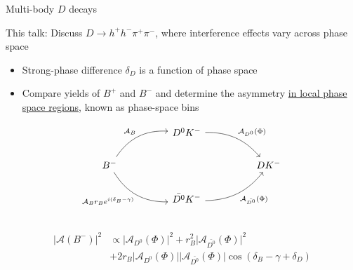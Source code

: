 \documentclass[xcolor={dvipsnames}]{beamer}
\begin{document}
\begin{frame}[fragile]{Multi-body $D$ decays}
  \begin{center}
    This talk: Discuss $D\to h^+h^-\pi^+\pi^-$, where interference effects vary across phase space
  \end{center}
  \vspace{-0.3cm}
  \begin{itemize}
    \setlength\itemsep{0.5em}
    \item{Strong-phase difference $\delta_D$ is a function of phase space}
    \item{Compare yields of $B^+$ and $B^-$ and determine the asymmetry \underline{in local phase space regions}, known as phase-space bins}
  \end{itemize}
  \begin{equation*}
    \begin{tikzcd}[column sep=huge]
      & D^0K^- \arrow[dr, bend left = 25, "\mathcal{A}_{D^0}(\Phi)"] & \\
      B^- \arrow[ur, bend left, "\mathcal{A}_B"] \arrow[dr, bend right, "\mathcal{A}_B r_B e^{i(\delta_B - \gamma)}"'] & [5cm] & DK^- \\
      & \bar{D^0}K^- \arrow[ur, bend right = 25, "\mathcal{A}_{\bar{D^0}}(\Phi)"'] & \\
    \end{tikzcd}
  \end{equation*}
  \vspace{-0.9cm}
  \begin{align*}
    \lvert\mathcal{A}(B^-)\lvert^2&\propto\lvert\mathcal{A}_{D^0}(\Phi)\lvert^2 + r_B^2\lvert\mathcal{A}_{\bar{D^0}}(\Phi)\lvert^2 \\
    &+ 2r_B\lvert\mathcal{A}_{D^0}(\Phi)\lvert\lvert\mathcal{A}_{\bar{D^0}}(\Phi)\lvert\cos(\delta_B - \gamma + \delta_D)
  \end{align*}
\end{frame}
\end{document}

